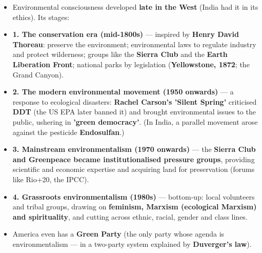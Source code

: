 \begin{KeyConcept}
\begin{itemize}
\item Environmental consciousness developed \textbf{late in the West} (India had it in its ethics). Its stages:
\item \textbf{1. The conservation era (mid-1800s)} --- inspired by \textbf{Henry David Thoreau}: preserve the environment; environmental laws to regulate industry and protect wilderness; groups like the \textbf{Sierra Club} and the \textbf{Earth Liberation Front}; national parks by legislation (\textbf{Yellowstone, 1872}; the Grand Canyon).
\item \textbf{2. The modern environmental movement (1950 onwards)} --- a response to ecological disasters: \textbf{Rachel Carson's 'Silent Spring'} criticised \textbf{DDT} (the US EPA later banned it) and brought environmental issues to the public, ushering in \textbf{'green democracy'}. (In India, a parallel movement arose against the pesticide \textbf{Endosulfan}.)
\item \textbf{3. Mainstream environmentalism (1970 onwards)} --- the \textbf{Sierra Club and Greenpeace became institutionalised pressure groups}, providing scientific and economic expertise and acquiring land for preservation (forums like Rio+20, the IPCC).
\item \textbf{4. Grassroots environmentalism (1980s)} --- bottom-up: local volunteers and tribal groups, drawing on \textbf{feminism, Marxism (ecological Marxism) and spirituality}, and cutting across ethnic, racial, gender and class lines.
\item America even has a \textbf{Green Party} (the only party whose agenda is environmentalism --- in a two-party system explained by \textbf{Duverger's law}).
\end{itemize}
\end{KeyConcept}


